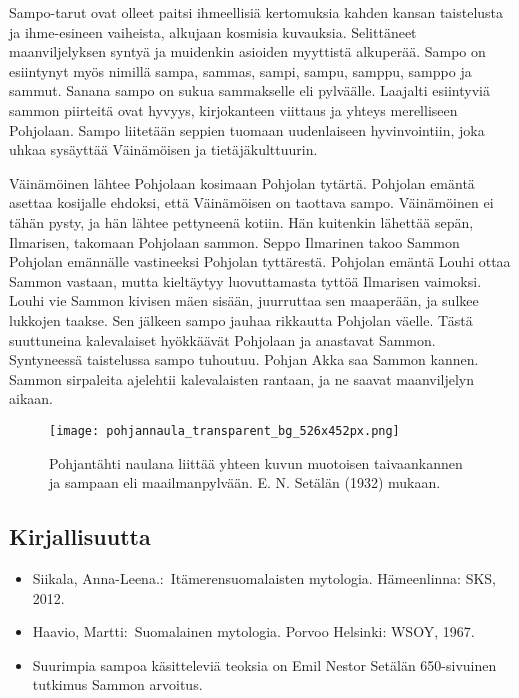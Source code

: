   Sampo-tarut ovat olleet paitsi ihmeellisiä kertomuksia kahden kansan taistelusta ja 
  ihme-esineen vaiheista, alkujaan kosmisia kuvauksia. Selittäneet maanviljelyksen syntyä ja 
  muidenkin asioiden myyttistä alkuperää. Sampo on esiintynyt myös nimillä sampa, sammas, sampi, 
  sampu, samppu, samppo ja sammut. Sanana sampo on sukua sammakselle eli pylväälle. Laajalti 
  esiintyviä sammon piirteitä ovat hyvyys, kirjokanteen viittaus ja yhteys merelliseen Pohjolaan. 
  Sampo liitetään seppien tuomaan uudenlaiseen hyvinvointiin, joka uhkaa sysäyttää Väinämöisen 
  ja tietäjäkulttuurin.

  Väinämöinen lähtee Pohjolaan kosimaan Pohjolan tytärtä. Pohjolan emäntä a\-settaa kosijalle 
  ehdoksi, että Väinämöisen on taottava sampo. Väinämöinen ei tähän pysty, ja hän lähtee 
  pettyneenä kotiin. Hän kuitenkin lähettää sepän, Ilmarisen, takomaan Pohjolaan sammon. Seppo 
  Ilmarinen takoo Sammon Pohjolan emännälle vastineeksi Pohjolan tyttärestä. Pohjolan emäntä 
  Louhi ottaa Sammon vastaan, mutta kieltäytyy luovuttamasta tyttöä Ilmarisen vaimoksi. Louhi vie 
  Sammon kivisen mäen sisään, juurruttaa sen maaperään, ja sulkee lukkojen taakse. Sen jälkeen 
  sampo jauhaa rikkautta Pohjolan väelle. Tästä suuttuneina kalevalaiset hyökkäävät Pohjolaan ja 
  anastavat Sammon. Syntyneessä taistelussa sampo tuhoutuu. Pohjan Akka saa Sammon kannen. Sammon 
  sirpaleita ajelehtii kalevalaisten rantaan, ja ne saavat maanviljelyn aikaan.

  \begin{figure}[!hb]
    \caption{Pohjantähti naulana liittää yhteen kuvun muotoisen taivaankannen ja sampaan eli maailmanpylvään. E. N. Setälän (1932) mukaan.}
    \centering
    \texttt{[image: pohjannaula\_transparent\_bg\_526x452px.png]}
  \end{figure}  
  
  
  
\subsection{Kirjallisuutta}

  \begin{itemize}
    \item Siikala, Anna-Leena.: Itämerensuomalaisten mytologia. Hämeenlinna: SKS, 2012. 
    \item Haavio, Martti: Suomalainen mytologia. Porvoo Helsinki: WSOY, 1967. 
    \item Suurimpia sampoa käsitteleviä teoksia on Emil Nestor Setälän 650-sivuinen tutkimus Sammon arvoitus.
  \end{itemize}

